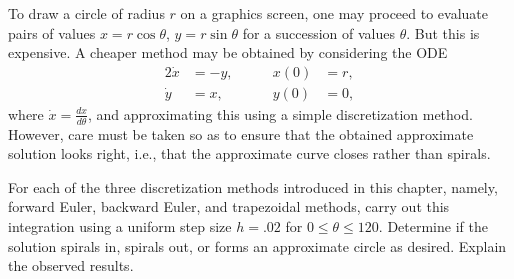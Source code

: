 \begin{problem}[A\&P 3.2]
  To draw a circle of radius $r$ on a graphics screen, one may proceed to evaluate pairs of values $x = r \cos \theta$, $y = r \sin \theta$ for a succession of values $\theta$. But this is expensive. A cheaper method may be obtained by considering the ODE
  \begin{alignat*}{2}
    \dot{x} &= -y, \quad&\quad x(0) &= r, \\
    \dot{y} &= x,  \quad&\quad y(0) &= 0, 
  \end{alignat*}
  where $\dot{x} = \frac{dx}{d\theta}$, and approximating this using a simple discretization method. However, care must be taken so as to ensure that the obtained approximate solution looks right, i.e., that the approximate curve closes rather than spirals.
  
  For each of the three discretization methods introduced in this chapter, namely, forward Euler, backward Euler, and trapezoidal methods, carry out this integration using a uniform step size $h = .02$ for $0 \leq \theta \leq 120$. Determine if the solution spirals in, spirals out, or forms an approximate circle as desired. Explain the observed results.
\end{problem}

